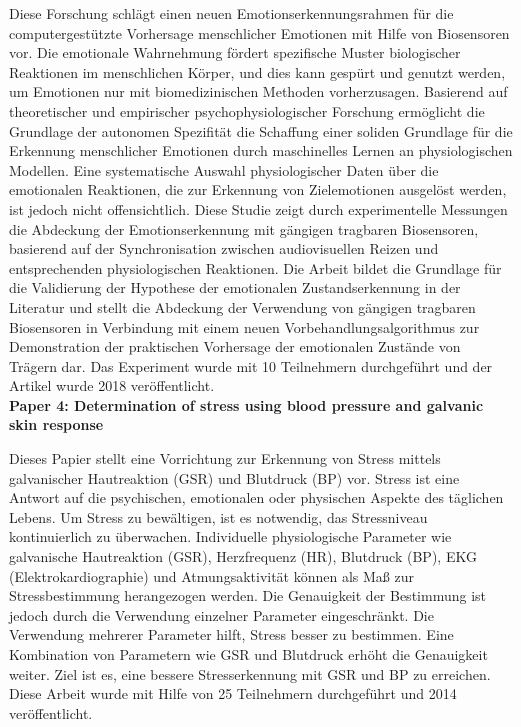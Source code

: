 Diese Forschung schlägt einen neuen Emotionserkennungsrahmen für die computergestützte Vorhersage menschlicher Emotionen mit Hilfe von Biosensoren vor. 
Die emotionale Wahrnehmung fördert spezifische Muster biologischer Reaktionen im menschlichen Körper, und dies kann gespürt und genutzt werden, um Emotionen nur mit biomedizinischen Methoden vorherzusagen. 
Basierend auf theoretischer und empirischer psychophysiologischer Forschung ermöglicht die Grundlage der autonomen Spezifität die Schaffung einer soliden Grundlage für die Erkennung menschlicher Emotionen durch maschinelles Lernen an physiologischen Modellen. 
Eine systematische Auswahl physiologischer Daten über die emotionalen Reaktionen, die zur Erkennung von Zielemotionen ausgelöst werden, ist jedoch nicht offensichtlich. 
Diese Studie zeigt durch experimentelle Messungen die Abdeckung der Emotionserkennung mit gängigen tragbaren Biosensoren, basierend auf der Synchronisation zwischen audiovisuellen Reizen und entsprechenden physiologischen Reaktionen. 
Die Arbeit bildet die Grundlage für die Validierung der Hypothese der emotionalen Zustandserkennung in der Literatur und stellt die Abdeckung der Verwendung von gängigen tragbaren Biosensoren in Verbindung mit einem neuen Vorbehandlungsalgorithmus zur Demonstration der praktischen Vorhersage der emotionalen Zustände von Trägern dar. 
Das Experiment wurde mit 10 Teilnehmern durchgeführt und der Artikel wurde 2018 veröffentlicht. \\


\textbf{Paper 4: Determination of stress using blood pressure and galvanic skin response}

Dieses Papier stellt eine Vorrichtung zur Erkennung von Stress mittels galvanischer Hautreaktion (GSR) und Blutdruck (BP) vor. 
Stress ist eine Antwort auf die psychischen, emotionalen oder physischen Aspekte des täglichen Lebens. 
Um Stress zu bewältigen, ist es notwendig, das Stressniveau kontinuierlich zu überwachen. 
Individuelle physiologische Parameter wie galvanische Hautreaktion (GSR), Herzfrequenz (HR), Blutdruck (BP), EKG (Elektrokardiographie) und Atmungsaktivität können als Maß zur Stressbestimmung herangezogen werden. 
Die Genauigkeit der Bestimmung ist jedoch durch die Verwendung einzelner Parameter eingeschränkt. 
Die Verwendung mehrerer Parameter hilft, Stress besser zu bestimmen. 
Eine Kombination von Parametern wie GSR und Blutdruck erhöht die Genauigkeit weiter. 
Ziel ist es, eine bessere Stresserkennung mit GSR und BP zu erreichen. 
Diese Arbeit wurde mit Hilfe von 25 Teilnehmern durchgeführt und 2014 veröffentlicht. \\


